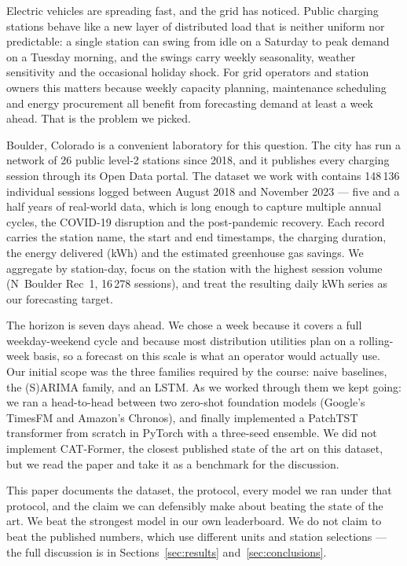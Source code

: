 Electric vehicles are spreading fast, and the grid has noticed. Public
charging stations behave like a new layer of distributed load that is
neither uniform nor predictable: a single station can swing from idle
on a Saturday to peak demand on a Tuesday morning, and the swings carry
weekly seasonality, weather sensitivity and the occasional holiday
shock. For grid operators and station owners this matters because
weekly capacity planning, maintenance scheduling and energy procurement
all benefit from forecasting demand at least a week ahead. That is the
problem we picked.

Boulder, Colorado is a convenient laboratory for this question. The
city has run a network of 26 public level-2 stations since 2018, and
it publishes every charging session through its Open Data portal.
The dataset we work with contains 148\,136 individual sessions logged
between August 2018 and November 2023 --- five and a half years of
real-world data, which is long enough to capture multiple annual
cycles, the COVID-19 disruption and the post-pandemic recovery. Each
record carries the station name, the start and end timestamps, the
charging duration, the energy delivered (kWh) and the estimated
greenhouse gas savings. We aggregate by station-day, focus on the
station with the highest session volume (N~Boulder Rec~1, 16\,278
sessions), and treat the resulting daily kWh series as our forecasting
target.

The horizon is seven days ahead. We chose a week because it covers
a full weekday-weekend cycle and because most distribution utilities
plan on a rolling-week basis, so a forecast on this scale is what an
operator would actually use. Our initial scope was the three families
required by the course: naive baselines, the (S)ARIMA family, and an
LSTM. As we worked through them we kept going: we ran a head-to-head
between two zero-shot foundation models (Google's TimesFM and Amazon's
Chronos), and finally implemented a PatchTST transformer from scratch
in PyTorch with a three-seed ensemble. We did not implement
CAT-Former, the closest published state of the art on this dataset,
but we read the paper and take it as a benchmark for the discussion.

This paper documents the dataset, the protocol, every model we ran
under that protocol, and the claim we can defensibly make about
beating the state of the art. We beat the strongest model in
our own leaderboard. We do not claim to beat the published numbers,
which use different units and station selections --- the full
discussion is in Sections~\ref{sec:results}
and~\ref{sec:conclusions}.

